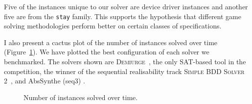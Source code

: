 Five of the instances unique to our solver are device driver instances and another five are from the \texttt{stay} family. This supports the hypothesis that different game solving methodologies perform better on certain classes of specifications.

I also present a cactus plot of the number of instances solved over time (Figure~\ref{fig:cactus}). We have plotted the best configuration of each solver we benchmarked. The solvers shown are \textsc{Demiurge}~\cite{Bloem14}, the only SAT-based tool in the competition, the winner of the sequential realisability track \textsc{Simple BDD Solver 2}~\cite{Walker14}, and AbsSynthe (seq3) \cite{Brenguier14}.

\begin{figure}
    \centering
    \pgfplotsset{width=\textwidth}
    \caption{Number of instances solved over time.}
    \label{fig:cactus}
\end{figure}


